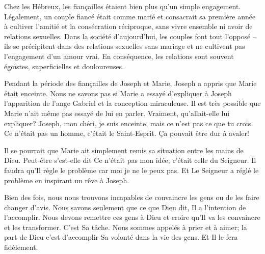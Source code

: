 


Chez les Hébreux, les fiançailles étaient bien plus qu'un simple engagement. Légalement, un couple fiancé était comme marié et consacrait sa première année à cultiver l'amitié et la consécration réciproque, sans vivre ensemble ni avoir de relations sexuelles. Dans la société d'aujourd'hui, les couples font tout l'opposé – ils se précipitent dans des relations sexuelles sans mariage et ne cultivent pas l'engagement d'un amour vrai. En conséquence, les relations sont souvent égoïstes, superficielles et douloureuses.

Pendant la période des fiançailles de Joseph et Marie, Joseph a appris que Marie était enceinte. Nous ne savons pas si Marie a essayé d'expliquer à Joseph l'apparition de l'ange Gabriel et la conception miraculeuse. Il est très possible que Marie n'ait même pas essayé de lui en parler. Vraiment, qu'allait-elle lui expliquer? \og Joseph, mon chéri, je suis enceinte, mais ce n'est pas ce que tu crois. Ce n'était pas un homme, c'était le Saint-Esprit. \fg{} Ça pouvait être dur à avaler!

Il se pourrait que Marie ait simplement remis sa situation entre les mains de Dieu. Peut-être s'est-elle dit\frcolon{} \og Ce n'était pas mon idée, c'était celle du Seigneur. Il faudra qu'Il règle le problème car moi je ne le peux pas. \fg{} Et Le Seigneur a réglé le problème en inspirant un rêve à Joseph.

Bien des fois, nous nous trouvons incapables de convaincre les gens ou de les faire changer d'avis. Nous savons seulement que ce que Dieu dit, Il a l'intention de l'accomplir. Nous devons remettre ces gens à Dieu et croire qu'Il va les convaincre et les transformer. C'est Sa tâche. Nous sommes appelés à prier et à aimer; la part de Dieu c'est d'accomplir Sa volonté dans la vie des gens. Et Il le fera fidèlement.




                      

